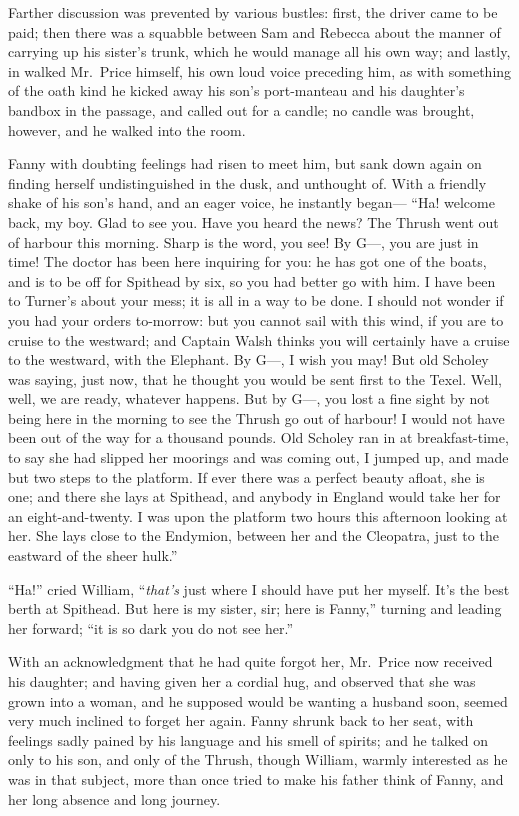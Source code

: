 Farther discussion was prevented by various bustles:
first, the driver came to be paid; then there was a squabble
between Sam and Rebecca about the manner of carrying up
his sister's trunk, which he would manage all his own way;
and lastly, in walked Mr.\ Price himself, his own loud
voice preceding him, as with something of the oath kind
he kicked away his son's port-manteau and his daughter's
bandbox in the passage, and called out for a candle;
no candle was brought, however, and he walked into the room.

Fanny with doubting feelings had risen to meet him,
but sank down again on finding herself undistinguished
in the dusk, and unthought of.  With a friendly shake
of his son's hand, and an eager voice, he instantly began---%
``Ha! welcome back, my boy.  Glad to see you.  Have you heard
the news?  The Thrush went out of harbour this morning.
Sharp is the word, you see!  By G---, you are just in time!
The doctor has been here inquiring for you:  he has got
one of the boats, and is to be off for Spithead by six,
so you had better go with him.  I have been to Turner's
about your mess; it is all in a way to be done.
I should not wonder if you had your orders to-morrow:
but you cannot sail with this wind, if you are to cruise
to the westward; and Captain Walsh thinks you will certainly
have a cruise to the westward, with the Elephant.
By G---, I wish you may!  But old Scholey was saying,
just now, that he thought you would be sent first to
the Texel.  Well, well, we are ready, whatever happens.
But by G---, you lost a fine sight by not being here
in the morning to see the Thrush go out of harbour!
I would not have been out of the way for a thousand pounds.
Old Scholey ran in at breakfast-time, to say she had
slipped her moorings and was coming out, I jumped up,
and made but two steps to the platform.  If ever there
was a perfect beauty afloat, she is one; and there she lays
at Spithead, and anybody in England would take her for an
eight-and-twenty. I was upon the platform two hours this
afternoon looking at her.  She lays close to the Endymion,
between her and the Cleopatra, just to the eastward of the
sheer hulk.''

``Ha!'' cried William, ``\emph{that's} just where I should have
put her myself.  It's the best berth at Spithead.
But here is my sister, sir; here is Fanny,'' turning and
leading her forward; ``it is so dark you do not see her.''

With an acknowledgment that he had quite forgot her,
Mr.\ Price now received his daughter; and having given
her a cordial hug, and observed that she was grown into
a woman, and he supposed would be wanting a husband soon,
seemed very much inclined to forget her again.
Fanny shrunk back to her seat, with feelings sadly
pained by his language and his smell of spirits;
and he talked on only to his son, and only of the Thrush,
though William, warmly interested as he was in that subject,
more than once tried to make his father think of Fanny,
and her long absence and long journey.

